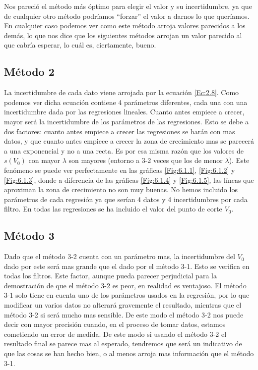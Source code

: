 \documentclass[12pt,a4paper]{article}
\numberwithin{equation}{section}
\numberwithin{table}{section}
\numberwithin{figure}{section}
\begin{document}
Nos pareció el método más óptimo para elegir el valor y su incertidumbre, ya que de cualquier otro método podríamos ``forzar'' el valor a darnos lo que queríamos. En cualquier caso podemos ver como este método arroja valores parecidos a los demás, lo que nos dice que los siguientes métodos arrojan un valor parecido al que cabría esperar, lo cuál es, ciertamente, bueno. 

\subsection{Método 2}

La incertidumbre de cada dato viene arrojada por la ecuación \ref{Ec:2.8}. Como podemos ver dicha ecuación contiene 4 parámetros diferentes, cada una con una incertidumbre dada por las regresiones lineales. Cuanto antes empiece a crecer, mayor será la incertidumbre de los parámetros de las regresiones. Esto se debe a dos factores: cuanto antes empiece a crecer las regresiones se harán con mas datos, y que cuanto antes empiece a crecer la zona de crecimiento mas se parecerá a una exponencial y no a una recta. Es por esa misma razón que los valores de $s(V_0)$ con mayor $\lambda$ son mayores (entorno a 3-2 veces que los de menor $\lambda$). Este fenómeno se puede ver perfectamente en las gráficas \ref{Fig:6.1.1}, \ref{Fig:6.1.2} y \ref{Fig:6.1.3}, donde a diferencia de las gráficas \ref{Fig:6.1.4} y \ref{Fig:6.1.5}, las líneas que aproximan la zona de crecimiento no son muy buenas. No hemos incluido los parámetros de cada regresión ya que serían 4 datos y 4 incertidumbres por cada filtro. En todas las regresiones se ha incluido el valor del punto de corte $V_0$.

\subsection{Método 3}

Dado que el método 3-2 cuenta con un parámetro mas, la incertidumbre del $V_0$ dado por este será mas grande que el dado por el método 3-1.  Esto se verifica en todas los filtros. Este factor, aunque pueda parecer perjudicial para la demostración de que el método 3-2 es peor, en realidad es ventajoso. El método 3-1 solo tiene en cuenta uno de los parámetros usados en la regresión, por lo que modificar un varios datos no alterará gravemente el resultado, mientras que el método 3-2 si será mucho mas sensible. De este modo el método 3-2 nos puede decir con mayor precisión cuando, en el proceso de tomar datos, estamos cometiendo un error de medida. De este modo si usando el método 3-2 el resultado final se parece mas al esperado, tendremos que será un indicativo de que las cosas se han hecho bien, o al menos arroja mas información que el método 3-1. \\
\end{document}
